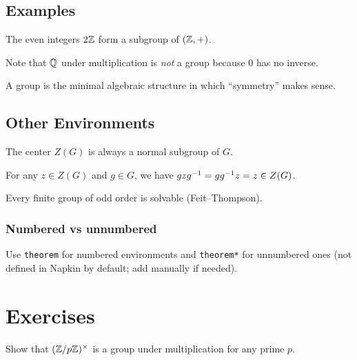 \documentclass[11pt,oneside]{scrbook}
\begin{document}
\subsection{Examples}

\begin{example}
    The even integers $2\mathbb{Z}$ form a subgroup of $(\mathbb{Z}, +)$.
\end{example}

\begin{remark}
    Note that $\mathbb{Q}$ under multiplication is \emph{not} a group because
    $0$ has no inverse.
\end{remark}

\begin{moral}
    A group is the minimal algebraic structure in which ``symmetry'' makes sense.
\end{moral}

\subsection{Other Environments}

\begin{claim}
    The center $Z(G)$ is always a normal subgroup of $G$.
\end{claim}
\begin{subproof}
    For any $z \in Z(G)$ and $g \in G$, we have $gzg^{-1} = gg^{-1} z = z \in Z(G)$.
\end{subproof}

\begin{fact}
    Every finite group of odd order is solvable (Feit--Thompson).
\end{fact}

\subsubsection{Numbered vs unnumbered}

Use \texttt{theorem} for numbered environments and \texttt{theorem*} for
unnumbered ones (not defined in Napkin by default; add manually if needed).

\section{Exercises}

\begin{exercise}
    Show that $(\mathbb{Z}/p\mathbb{Z})^\times$ is a group under multiplication for any prime $p$.
\end{exercise}
\end{document}
